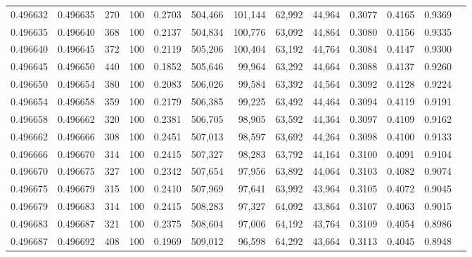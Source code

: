 \begin{tabular}{rrrrrrrrrrrrr}
0.496632 & 0.496635 &   270 & 100 &                                     0.2703 & 504,466 & 101,144 &  62,992 &  44,964 & 0.3077 & 0.4165 & 0.9369 \\
0.496635 & 0.496640 &   368 & 100 &                                     0.2137 & 504,834 & 100,776 &  63,092 &  44,864 & 0.3080 & 0.4156 & 0.9335 \\
0.496640 & 0.496645 &   372 & 100 &                                     0.2119 & 505,206 & 100,404 &  63,192 &  44,764 & 0.3084 & 0.4147 & 0.9300 \\
0.496645 & 0.496650 &   440 & 100 &                                     0.1852 & 505,646 &  99,964 &  63,292 &  44,664 & 0.3088 & 0.4137 & 0.9260 \\
0.496650 & 0.496654 &   380 & 100 &                                     0.2083 & 506,026 &  99,584 &  63,392 &  44,564 & 0.3092 & 0.4128 & 0.9224 \\
0.496654 & 0.496658 &   359 & 100 &                                     0.2179 & 506,385 &  99,225 &  63,492 &  44,464 & 0.3094 & 0.4119 & 0.9191 \\
0.496658 & 0.496662 &   320 & 100 &                                     0.2381 & 506,705 &  98,905 &  63,592 &  44,364 & 0.3097 & 0.4109 & 0.9162 \\
0.496662 & 0.496666 &   308 & 100 &                                     0.2451 & 507,013 &  98,597 &  63,692 &  44,264 & 0.3098 & 0.4100 & 0.9133 \\
0.496666 & 0.496670 &   314 & 100 &                                     0.2415 & 507,327 &  98,283 &  63,792 &  44,164 & 0.3100 & 0.4091 & 0.9104 \\
0.496670 & 0.496675 &   327 & 100 &                                     0.2342 & 507,654 &  97,956 &  63,892 &  44,064 & 0.3103 & 0.4082 & 0.9074 \\
0.496675 & 0.496679 &   315 & 100 &                                     0.2410 & 507,969 &  97,641 &  63,992 &  43,964 & 0.3105 & 0.4072 & 0.9045 \\
0.496679 & 0.496683 &   314 & 100 &                                     0.2415 & 508,283 &  97,327 &  64,092 &  43,864 & 0.3107 & 0.4063 & 0.9015 \\
0.496683 & 0.496687 &   321 & 100 &                                     0.2375 & 508,604 &  97,006 &  64,192 &  43,764 & 0.3109 & 0.4054 & 0.8986 \\
0.496687 & 0.496692 &   408 & 100 &                                     0.1969 & 509,012 &  96,598 &  64,292 &  43,664 & 0.3113 & 0.4045 & 0.8948 \\

\end{tabular}
